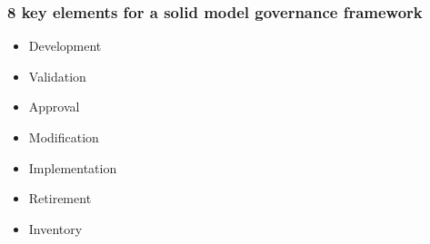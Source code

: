 \documentclass[11pt]{beamer}
\begin{document}
\begin{frame}
\frametitle{8 key elements for a solid model governance framework}
\begin{itemize}
\item Development %
\item Validation %
\item Approval %
\item Modification %
\item Implementation %
\item Retirement %
\item Inventory %

\end{itemize}
\end{frame}
\end{document}
